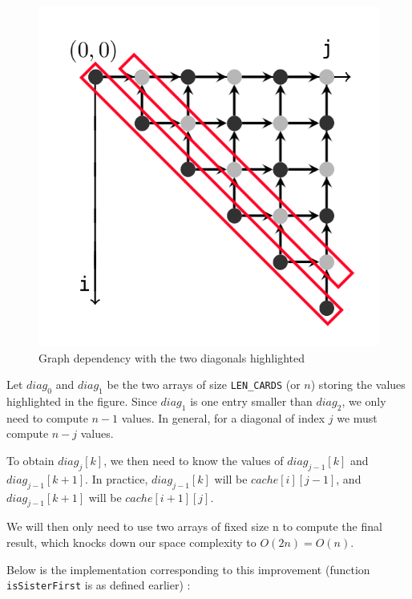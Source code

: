 \documentclass[a4paper,12pt,fleqn]{article}
\newcommand\ezskip{\medskip\noindent}
\begin{document}
\begin{figure}[H]
    \centering
    \includegraphics[scale=0.5]{tabulation_04.png}

    \caption{Graph dependency with the two diagonals highlighted}
    \label{fig:tabulation_04}
\end{figure}

Let \texttt{$diag_0$} and \texttt{$diag_1$} be the two arrays of size \texttt{LEN\_CARDS} (or $n$) storing the values highlighted in the figure.
Since \texttt{$diag_1$} is one entry smaller than \texttt{$diag_2$}, we only need to compute $n - 1$ values. In general, for a diagonal of index $j$ we must compute $n - j$ values.

\ezskip
To obtain \texttt{$diag_j[k]$}, we then need to know the values of $diag_{j-1}[k]$ and $diag_{j-1}[k+1]$. In practice, $diag_{j-1}[k]$ will be $cache[i][j-1]$, and $diag_{j-1}[k+1]$ will be $cache[i+1][j]$.

\ezskip
We will then only need to use two arrays of fixed size n to compute the final result, which knocks down our space complexity to $O(2n) = O(n)$.

\medskip
Below is the implementation corresponding to this improvement (function \texttt{isSisterFirst} is as defined earlier) :
\end{document}
